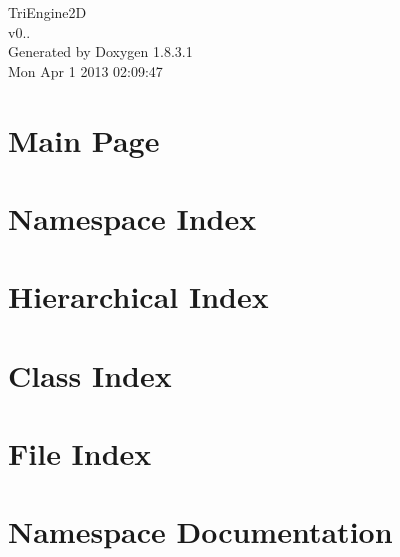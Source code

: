 \documentclass{book}
\begin{document}
\hypersetup{pageanchor=false,citecolor=blue}
\begin{titlepage}
\vspace*{7cm}
\begin{center}
{\Large Tri\-Engine2\-D \\[1ex]\large v0.. }\\
\vspace*{1cm}
{\large Generated by Doxygen 1.8.3.1}\\
\vspace*{0.5cm}
{\small Mon Apr 1 2013 02:09:47}\\
\end{center}
\end{titlepage}
\clearemptydoublepage
{}
\tableofcontents
\clearemptydoublepage
{}
\hypersetup{pageanchor=true,citecolor=blue}
\chapter{Main Page}
\label{index}\hypertarget{index}{}
\chapter{Namespace Index}

\chapter{Hierarchical Index}

\chapter{Class Index}

\chapter{File Index}

\chapter{Namespace Documentation}

















\end{document}
